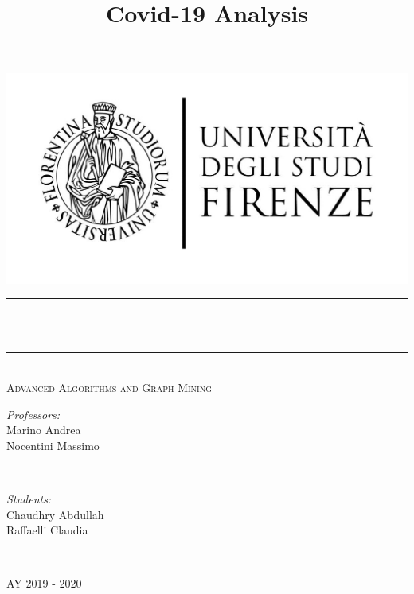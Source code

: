 \documentclass[11pt]{article}
\title{Covid-19 Analysis}
\begin{document}

\begin{titlepage}
	\centering
    \vspace*{0.5 cm}
    \includegraphics[scale = 1]{imgs/Logo-unifi.jpg}\\[1.0 cm]

	\rule{\linewidth}{0.2 mm} \\[0.4 cm]
	{ \huge \bfseries \thetitle}\\
	\rule{\linewidth}{0.2 mm} \\[1 cm]

	\textsc{\large Advanced Algorithms and Graph Mining}\\[5 cm]
	\begin{minipage}{0.5\textwidth}
		\begin{flushleft} \large
			\emph{Professors:}\\
			Marino Andrea\\
			Nocentini Massimo\\
			\end{flushleft}
			\end{minipage}~
			\begin{minipage}{0.4\textwidth}
        
		\begin{flushright} \large
			\emph{Students:} \\
			Chaudhry Abdullah\\
			Raffaelli Claudia\\
		\end{flushright}
        
	\end{minipage}\\[0.1 cm]
	
	\vspace*{2.6 cm}
	\begin{center} \large
			AY 2019 - 2020
		\end{center}

	
\end{titlepage}
\end{document}
